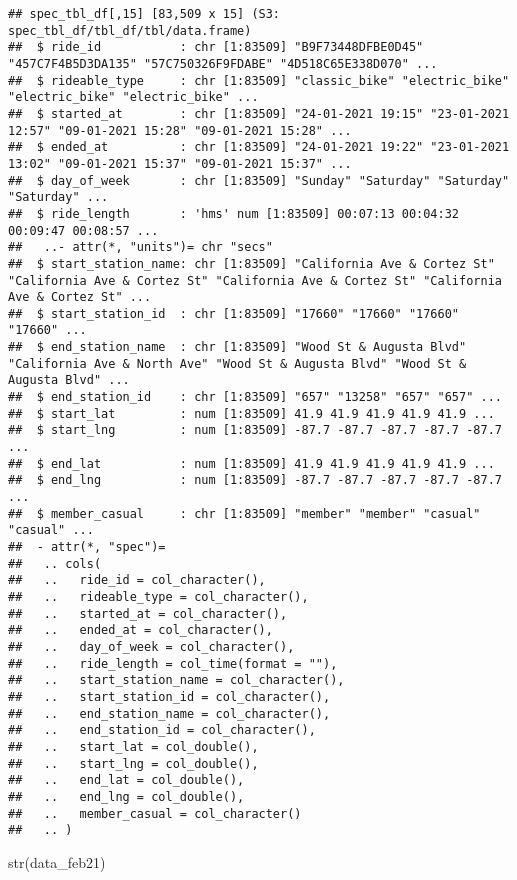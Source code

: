 \documentclass[
]{article}
\newenvironment{Shaded}{\begin{snugshade}}{\end{snugshade}}
\newcommand{\FunctionTok}[1]{\textcolor[rgb]{0.00,0.00,0.00}{#1}}
\newcommand{\NormalTok}[1]{#1}
\begin{document}
\begin{verbatim}
## spec_tbl_df[,15] [83,509 x 15] (S3: spec_tbl_df/tbl_df/tbl/data.frame)
##  $ ride_id           : chr [1:83509] "B9F73448DFBE0D45" "457C7F4B5D3DA135" "57C750326F9FDABE" "4D518C65E338D070" ...
##  $ rideable_type     : chr [1:83509] "classic_bike" "electric_bike" "electric_bike" "electric_bike" ...
##  $ started_at        : chr [1:83509] "24-01-2021 19:15" "23-01-2021 12:57" "09-01-2021 15:28" "09-01-2021 15:28" ...
##  $ ended_at          : chr [1:83509] "24-01-2021 19:22" "23-01-2021 13:02" "09-01-2021 15:37" "09-01-2021 15:37" ...
##  $ day_of_week       : chr [1:83509] "Sunday" "Saturday" "Saturday" "Saturday" ...
##  $ ride_length       : 'hms' num [1:83509] 00:07:13 00:04:32 00:09:47 00:08:57 ...
##   ..- attr(*, "units")= chr "secs"
##  $ start_station_name: chr [1:83509] "California Ave & Cortez St" "California Ave & Cortez St" "California Ave & Cortez St" "California Ave & Cortez St" ...
##  $ start_station_id  : chr [1:83509] "17660" "17660" "17660" "17660" ...
##  $ end_station_name  : chr [1:83509] "Wood St & Augusta Blvd" "California Ave & North Ave" "Wood St & Augusta Blvd" "Wood St & Augusta Blvd" ...
##  $ end_station_id    : chr [1:83509] "657" "13258" "657" "657" ...
##  $ start_lat         : num [1:83509] 41.9 41.9 41.9 41.9 41.9 ...
##  $ start_lng         : num [1:83509] -87.7 -87.7 -87.7 -87.7 -87.7 ...
##  $ end_lat           : num [1:83509] 41.9 41.9 41.9 41.9 41.9 ...
##  $ end_lng           : num [1:83509] -87.7 -87.7 -87.7 -87.7 -87.7 ...
##  $ member_casual     : chr [1:83509] "member" "member" "casual" "casual" ...
##  - attr(*, "spec")=
##   .. cols(
##   ..   ride_id = col_character(),
##   ..   rideable_type = col_character(),
##   ..   started_at = col_character(),
##   ..   ended_at = col_character(),
##   ..   day_of_week = col_character(),
##   ..   ride_length = col_time(format = ""),
##   ..   start_station_name = col_character(),
##   ..   start_station_id = col_character(),
##   ..   end_station_name = col_character(),
##   ..   end_station_id = col_character(),
##   ..   start_lat = col_double(),
##   ..   start_lng = col_double(),
##   ..   end_lat = col_double(),
##   ..   end_lng = col_double(),
##   ..   member_casual = col_character()
##   .. )
\end{verbatim}

\begin{Shaded}
\begin{Highlighting}[]
\FunctionTok{str}\NormalTok{(data\_feb21)}
\end{Highlighting}
\end{Shaded}
\end{document}
